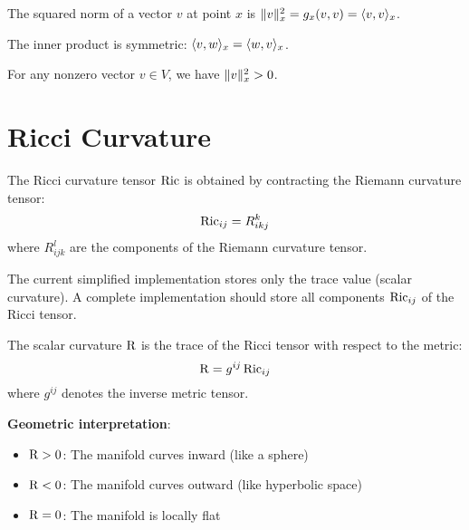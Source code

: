 \begin{definition}
\label{def:norm-squared}
The squared norm of a vector $v$ at point $x$ is $\| v \|^2_x = g_x(v, v) = \langle v, v \rangle_x$.
\end{definition}

\begin{lemma}
\label{lem:inner-product-symm}
\leanok
{}
The inner product is symmetric: $\langle v, w \rangle_x = \langle w, v \rangle_x$.
\end{lemma}

\begin{lemma}
\label{lem:norm-sq-pos}
\leanok
{}
For any nonzero vector $v \in V$, we have $\| v \|^2_x > 0$.
\end{lemma}

\chapter{Ricci Curvature}
\label{chap:ricci}

\begin{definition}
\label{def:ricci-tensor}
The Ricci curvature tensor $\operatorname{Ric}$ is obtained by contracting the Riemann curvature tensor:
\[
\operatorname{Ric}_{ij} = R^k_{ikj}
\]
where $R^l_{ijk}$ are the components of the Riemann curvature tensor.
\end{definition}

\begin{remark}
The current simplified implementation stores only the trace value (scalar curvature). A complete implementation should store all components $\operatorname{Ric}_{ij}$ of the Ricci tensor.
\end{remark}

\begin{definition}
\label{def:scalar-curvature}
The scalar curvature $\operatorname{R}$ is the trace of the Ricci tensor with respect to the metric:
\[
\operatorname{R} = g^{ij} \operatorname{Ric}_{ij}
\]
where $g^{ij}$ denotes the inverse metric tensor.

\textbf{Geometric interpretation}:
\begin{itemize}
\item $\operatorname{R} > 0$: The manifold curves inward (like a sphere)
\item $\operatorname{R} < 0$: The manifold curves outward (like hyperbolic space)
\item $\operatorname{R} = 0$: The manifold is locally flat
\end{itemize}
\end{definition}

